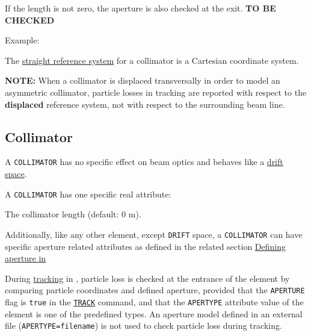 {\begin{5.02.04}
If the length is not zero, the aperture is also checked at the
exit. \textbf{ TO BE CHECKED } 

Example: 

The \hyperref[subsec:local_straight]{straight reference system} for a
collimator is a Cartesian coordinate system.  

\textbf{NOTE:} When a collimator is displaced transversally in order to
model an asymmetric collimator, particle losses in tracking are
reported with respect to the \textbf{displaced} reference system, not
with respect to the surrounding beam line.

\end{5.02.04}

\begin{5.02.05}
\section{Collimator}
\label{sec:collimator}

A {\tt COLLIMATOR} has no specific effect on beam optics and behaves like a
\hyperref[sec:drift]{drift space}. 



A {\tt COLLIMATOR} has one specific real attribute: 
\begin{madlist}
	 The collimator length (default: 0 m). 
\end{madlist}

Additionally, like any other element, except {\tt DRIFT} space, 
a {\tt COLLIMATOR} can have specific aperture related attributes 
as defined in the related section \hyperref[sec:def_aper]{Defining 
aperture in \madx}

During \hyperref[chap:thin_track]{tracking} in \madx, particle loss 
is checked at the entrance of the element by comparing particle coordinates 
and defined aperture, provided that the {\tt APERTURE} flag is {\tt true} 
in the \hyperref[sec:track]{\tt TRACK} command, 
and that the {\tt APERTYPE} attribute value of the element is one of the 
predefined types. 
An aperture model defined in an external file ({\tt APERTYPE=filename})
is not used to check particle loss during tracking. 



\end{5.02.05}}
